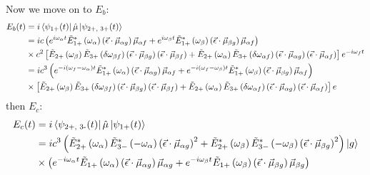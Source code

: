 Now we move on to  $E_b$:
\begin{align*}
	E_b (t) &=  i \bra{\psi_{\text{1+}} (t)} \hat{\mu} \ket{\psi_{\text{2+, 3+}} (t)}\\
	&= ic \left( e^{i \omega_{\alpha} t }\tilde{E}^*_{1+} \left( \omega_{\alpha} \right) \left(  \vec{\epsilon} \cdot \vec{\mu}_{\alpha g} \right) \vec{\mu}_{\alpha f} + e^{i \omega_{\beta} t }\tilde{E}^*_{1+} \left( \omega_{\beta} \right) \left( \vec{\epsilon} \cdot \vec{\mu}_{\beta g}\right)  \vec{\mu}_{\alpha f}  \right) \\
	&\times c^2 \left[ \tilde{E}_{2+} \left( \omega_{\beta} \right) \tilde{E}_{3+} \left( \delta \omega_{\beta f} \right) \left( \vec{\epsilon} \cdot \vec{\mu}_{\beta g} \right) \left( \vec{\epsilon} \cdot \vec{\mu}_{\beta f} \right) + \tilde{E}_{2+} \left( \omega_{\alpha} \right) \tilde{E}_{3+} \left( \delta\omega_{\alpha f} \right) \left( \vec{\epsilon} \cdot \vec{\mu}_{\alpha g} \right) \left( \vec{\epsilon} \cdot \vec{\mu}_{\alpha f} \right) \right]e^{- i \omega_f t} \\
	&= ic^3 \left( e^{-i( \omega_f -  \omega_{\alpha}) t }\tilde{E}^*_{1+} \left( \omega_{\alpha} \right) \left(  \vec{\epsilon} \cdot \vec{\mu}_{\alpha g} \right) \vec{\mu}_{\alpha f} + e^{-i ( \omega_f -  \omega_{\beta} ) t }\tilde{E}^*_{1+} \left( \omega_{\beta} \right) \left( \vec{\epsilon} \cdot \vec{\mu}_{\beta g}\right)  \vec{\mu}_{\alpha f}  \right) \\
	&\times  \left[ \tilde{E}_{2+} \left( \omega_{\beta} \right) \tilde{E}_{3+} \left( \delta \omega_{\beta f} \right) \left( \vec{\epsilon} \cdot \vec{\mu}_{\beta g} \right) \left( \vec{\epsilon} \cdot \vec{\mu}_{\beta f} \right) + \tilde{E}_{2+} \left( \omega_{\alpha} \right) \tilde{E}_{3+} \left( \delta\omega_{\alpha f} \right) \left( \vec{\epsilon} \cdot \vec{\mu}_{\alpha g} \right) \left( \vec{\epsilon} \cdot \vec{\mu}_{\alpha f} \right) \right]e
\end{align*}
then $E_c$:
\begin{align}
	E_c (t) &=  i \bra{\psi_{\text{2+, 3-}} (t)} \hat{\mu} \ket{\psi_{\text{1+}} (t)}\\
	&= ic^3 \left( \tilde{E}^*_{2+} \left( \omega_{\alpha} \right)\tilde{E}^*_{3-} \left( -\omega_{\alpha} \right) \left( \vec{\epsilon} \cdot \vec{\mu}_{\alpha g}\right)^2  + \tilde{E}^*_{2+} \left( \omega_{\beta} \right) \tilde{E}^*_{3-} \left( -\omega_{\beta} \right) \left(\vec{\epsilon} \cdot \vec{\mu}_{\beta g} \right)^2   \right) \ket{g} \\
	&\times \left( e^{-i \omega_{\alpha} t }\tilde{E}_{1+} \left( \omega_{\alpha} \right) \left( \vec{\epsilon} \cdot \vec{\mu}_{\alpha g} \right)   \vec{\mu}_{\alpha g} + e^{-i \omega_{\beta} t }\tilde{E}_{1+} \left( \omega_{\beta} \right) \left( \vec{\epsilon} \cdot \vec{\mu}_{\beta g} \right)  \vec{\mu}_{\beta g} \right)
\end{align}
